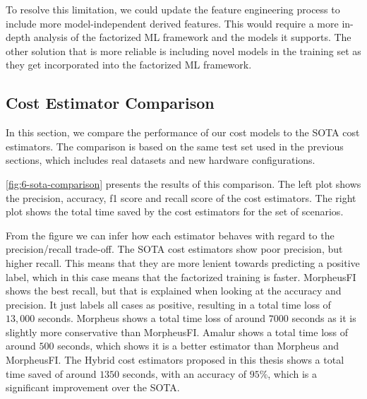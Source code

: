 To resolve this limitation, we could update the feature engineering process to include more model-independent derived features. This would require a more in-depth analysis of the factorized ML framework and the models it supports. The other solution that is more reliable is including novel models in the training set as they get incorporated into the factorized ML framework.

\subsection{Cost Estimator Comparison}
\label{subsec:6-sota-comparison}

In this section, we compare the performance of our cost models to the SOTA cost estimators. The comparison is based on the same test set used in the previous sections, which includes real datasets and new hardware configurations.

\autoref{fig:6-sota-comparison} presents the results of this comparison. The left plot shows the precision, accuracy, f1 score and recall score of the cost estimators. The right plot shows the total time saved by the cost estimators for the set of scenarios.

From the figure we can infer how each estimator behaves with regard to the precision/recall trade-off. The SOTA cost estimators show poor precision, but higher recall. This means that they are more lenient towards predicting a positive label, which in this case means that the factorized training is faster. MorpheusFI \cite{MorpheusFI} shows the best recall, but that is explained when looking at the accuracy and precision. It just labels all cases as positive, resulting in a total time loss of $13,000$ seconds. Morpheus \cite{orion_learning_gen_lin_models} shows a total time loss of around $7000$ seconds as it is slightly more conservative than MorpheusFI. Amalur \cite{amalur} shows a total time loss of around $500$ seconds, which shows it is a better estimator than Morpheus and MorpheusFI. The Hybrid cost estimators proposed in this thesis shows a total time saved of around $1350$ seconds, with an accuracy of $95\%$, which is a significant improvement over the SOTA.


